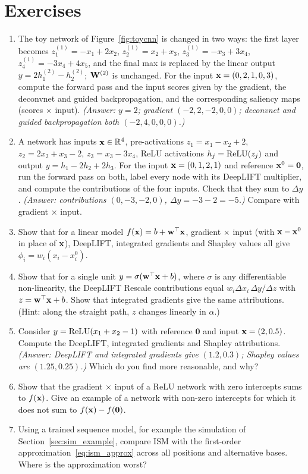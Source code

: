 \section*{Exercises}

\begin{enumerate}
  \item The toy network of Figure~\ref{fig:toycnn} is changed in two ways: the first layer becomes $z^{(1)}_1=-x_1+2x_2$, $z^{(1)}_2=x_2+x_3$, $z^{(1)}_3=-x_3+3x_4$, $z^{(1)}_4=-3x_4+4x_5$, and the final max is replaced by the linear output $y=2h^{(2)}_1-h^{(2)}_2$; $\mathbf{W}^{(2)}$ is unchanged. For the input $\mathbf{x}=(0,2,1,0,3)$, compute the forward pass and the input scores given by the gradient, the deconvnet and guided backpropagation, and the corresponding saliency maps (scores $\times$ input). \emph{(Answer: $y=2$; gradient $(-2,2,-2,0,0)$; deconvnet and guided backpropagation both $(-2,4,0,0,0)$.)}
  \item A network has inputs $\mathbf{x}\in\mathbb{R}^4$, pre-activations $z_1=x_1-x_2+2$, $z_2=2x_2+x_3-2$, $z_3=x_3-3x_4$, ReLU activations $h_j=\operatorname{ReLU}(z_j)$ and output $y=h_1-2h_2+2h_3$. For the input $\mathbf{x}=(0,1,2,1)$ and reference $\mathbf{x}^0=\mathbf{0}$, run the forward pass on both, label every node with its DeepLIFT multiplier, and compute the contributions of the four inputs. Check that they sum to $\Delta y$. \emph{(Answer: contributions $(0,-3,-2,0)$, $\Delta y=-3-2=-5$.)} Compare with gradient $\times$ input.
  \item Show that for a linear model $f(\mathbf{x})=b+\mathbf{w}^\top\mathbf{x}$, gradient $\times$ input (with $\mathbf{x}-\mathbf{x}^0$ in place of $\mathbf{x}$), DeepLIFT, integrated gradients and Shapley values all give $\phi_i=w_i(x_i-x_i^0)$.
  \item Show that for a single unit $y=\sigma(\mathbf{w}^\top\mathbf{x}+b)$, where $\sigma$ is any differentiable non-linearity, the DeepLIFT Rescale contributions equal $w_i\Delta x_i\,\Delta y/\Delta z$ with $z=\mathbf{w}^\top\mathbf{x}+b$. Show that integrated gradients give the same attributions. (Hint: along the straight path, $z$ changes linearly in $\alpha$.)
  \item Consider $y=\operatorname{ReLU}(x_1+x_2-1)$ with reference $\mathbf{0}$ and input $\mathbf{x}=(2,0.5)$. Compute the DeepLIFT, integrated gradients and Shapley attributions. \emph{(Answer: DeepLIFT and integrated gradients give $(1.2,0.3)$; Shapley values are $(1.25,0.25)$.)} Which do you find more reasonable, and why?
  \item Show that the gradient $\times$ input of a ReLU network with zero intercepts sums to $f(\mathbf{x})$. Give an example of a network with non-zero intercepts for which it does not sum to $f(\mathbf{x})-f(\mathbf{0})$.
  \item Using a trained sequence model, for example the simulation of Section~\ref{sec:sim_example}, compare ISM with the first-order approximation~\eqref{eq:ism_approx} across all positions and alternative bases. Where is the approximation worst?
\end{enumerate}
